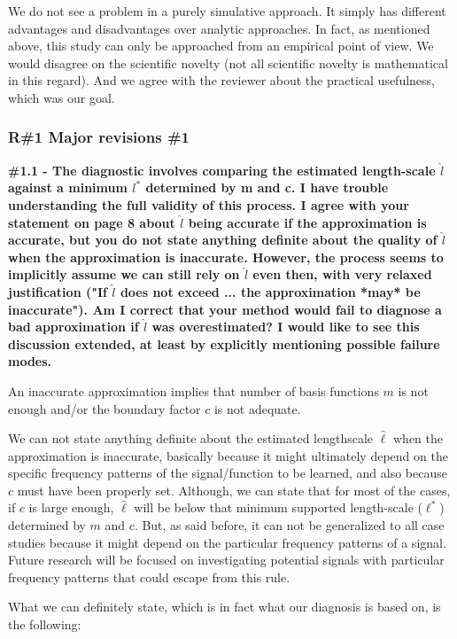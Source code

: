 \documentclass[11pt]{report}
\begin{document}
We do not see a problem in a purely simulative approach. It simply has different advantages and disadvantages over analytic approaches. In fact, as mentioned above, this study can only be approached from an empirical point of view. We would disagree on the scientific novelty (not all scientific novelty is mathematical in this regard). And we agree with the reviewer about the practical usefulness, which was our goal.

\subsubsection*{R\#1 Major revisions \#1}

\textbf{\#1.1 - The diagnostic involves comparing the estimated length-scale $\hat l$ against a minimum $l^*$ determined by m and c. I have trouble understanding the full validity of this process. I agree with your statement on page 8 about $\hat l$ being accurate if the approximation is accurate, but you do not state anything definite about the quality of $\hat l$ when the approximation is inaccurate. However, the process seems to implicitly assume we can still rely on $\hat l$ even then, with very relaxed justification ("If $\hat l$ does not exceed ... the approximation *may* be inaccurate"). Am I correct that your method would fail to diagnose a bad approximation if $\hat l$ was overestimated? I would like to see this discussion extended, at least by explicitly mentioning possible failure modes.}

An inaccurate approximation implies that number of basis functions $m$ is not enough and/or the boundary factor $c$ is not adequate.

We can not state anything definite about the estimated lengthscale $\hat{\ell}$ when the approximation is inaccurate, basically because it might ultimately depend on the specific frequency patterns of the signal/function to be learned, and also because $c$ must have been properly set. Although, we can state that for most of the cases, if $c$ is large enough, $\hat{\ell}$ will be below that minimum supported length-scale ($\ell^*$) determined by $m$ and $c$. But, as said before, it can not be generalized to all case studies because it might depend on the particular frequency patterns of a signal. Future research will be focused on investigating potential signals with particular frequency patterns that could escape from this rule.

What we can definitely state, which is in fact what our diagnosis is based on, is the following:
\end{document}
